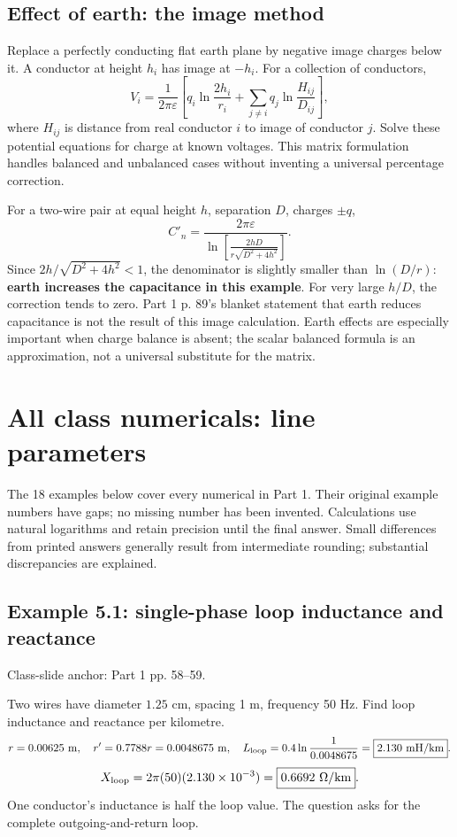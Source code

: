 \documentclass[11pt,a4paper]{article}
\newcommand{\slides}[1]{{\small\color{muted}\textsf{Class-slide anchor: #1.}}\par}
\newcommand{\chapterstart}[2]{\clearpage\section{#1}\label{#2}}
\newcommand{\ans}[1]{\boxed{#1}}
\begin{document}
\subsection{Effect of earth: the image method}
Replace a perfectly conducting flat earth plane by negative image charges below it. A conductor at height $h_i$ has image at $-h_i$. For a collection of conductors,
\[
 V_i=\frac1{2\pi\varepsilon}
 \left[q_i\ln\frac{2h_i}{r_i}+
 \sum_{j\ne i}q_j\ln\frac{H_{ij}}{D_{ij}}\right],
\]
where $H_{ij}$ is distance from real conductor $i$ to image of conductor $j$. Solve these potential equations for charge at known voltages. This matrix formulation handles balanced and unbalanced cases without inventing a universal percentage correction.
\begin{center}
\end{center}
For a two-wire pair at equal height $h$, separation $D$, charges $\pm q$,
\[
 C'_n=\frac{2\pi\varepsilon}{\ln\left[\frac{2hD}{r\sqrt{D^2+4h^2}}\right]}.
\]
Since $2h/\sqrt{D^2+4h^2}<1$, the denominator is slightly smaller than $\ln(D/r)$: \textbf{earth increases the capacitance in this example}. For very large $h/D$, the correction tends to zero. Part 1 p. 89's blanket statement that earth reduces capacitance is not the result of this image calculation. Earth effects are especially important when charge balance is absent; the scalar balanced formula is an approximation, not a universal substitute for the matrix.
\chapterstart{All class numericals: line parameters}{parameterexamples}
The 18 examples below cover every numerical in Part 1. Their original example numbers have gaps; no missing number has been invented. Calculations use natural logarithms and retain precision until the final answer. Small differences from printed answers generally result from intermediate rounding; substantial discrepancies are explained.
\subsection{Example 5.1: single-phase loop inductance and reactance}
\slides{Part 1 pp. 58--59}
Two wires have diameter $1.25$ cm, spacing 1 m, frequency 50 Hz. Find loop inductance and reactance per kilometre.
\[
 r=0.00625\ \mathrm m,\quad r'=0.7788r=0.0048675\ \mathrm m,
 \quad L_{\rm loop}=0.4\ln\frac1{0.0048675}=\ans{2.130\ \mathrm{mH/km}}.
\]
\[
 X_{\rm loop}=2\pi(50)(2.130\times10^{-3})=\ans{0.6692\ \Omega/\mathrm{km}}.
\]
One conductor's inductance is half the loop value. The question asks for the complete outgoing-and-return loop.
\end{document}
